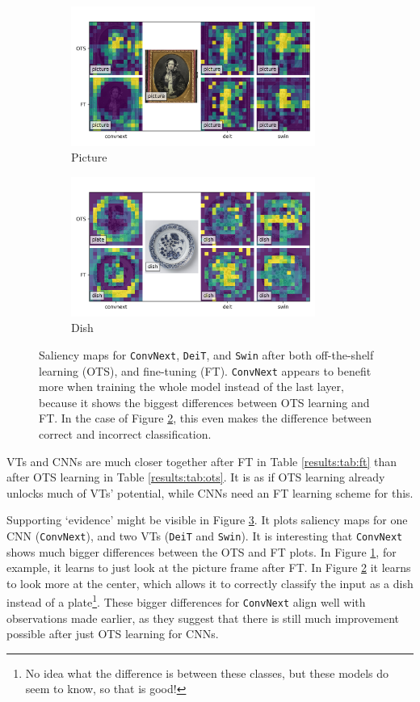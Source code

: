 \begin{figure}[tb]
    \centering
    \begin{subfigure}{0.49\textwidth}
    \includegraphics[width=8cm]{img/img011_salience.png}
    \caption{Picture}
    \label{results:img:sal:picture}
    \end{subfigure}
    \begin{subfigure}{0.49\textwidth}
    \includegraphics[width=8cm]{img/img005_salience.png}
    \caption{Dish}
    \label{results:img:sal:dish}
    \end{subfigure}
    \caption{Saliency maps for \texttt{ConvNext}, \texttt{DeiT}, and \texttt{Swin} after both off-the-shelf learning (OTS), and fine-tuning (FT). \texttt{ConvNext} appears to benefit more when training the whole model instead of the last layer, because it shows the biggest differences between OTS learning and FT. In the case of Figure \ref{results:img:sal:dish}, this even makes the difference between correct and incorrect classification.}
    \label{results:img:sal}
\end{figure}

VTs and CNNs are much closer together after FT in Table \ref{results:tab:ft} than after OTS learning in Table \ref{results:tab:ots}. It is as if OTS learning already unlocks much of VTs' potential, while CNNs need an FT learning scheme for this.

Supporting `evidence' might be visible in Figure \ref{results:img:sal}. It plots saliency maps for one CNN (\texttt{ConvNext}), and two VTs (\texttt{DeiT} and \texttt{Swin}). It is interesting that \texttt{ConvNext} shows much bigger differences between the OTS and FT plots. In Figure \ref{results:img:sal:picture}, for example, it learns to just look at the picture frame after FT. In Figure \ref{results:img:sal:dish} it learns to look more at the center, which allows it to correctly classify the input as a dish instead of a plate\footnote{No idea what the difference is between these classes, but these models do seem to know, so that is good!}. %
These bigger differences for \texttt{ConvNext} align well with observations made earlier, as they suggest that there is still much improvement possible after just OTS learning for CNNs.

